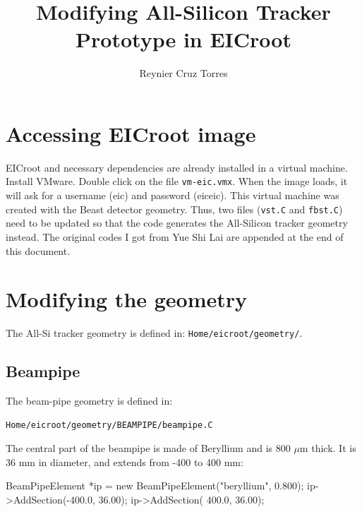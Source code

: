 \documentclass[12pt]{article}
\title{Modifying All-Silicon Tracker Prototype in EICroot}
\author{Reynier Cruz Torres}
\begin{document}
\maketitle

\tableofcontents

\newpage
\section{Accessing EICroot image}

EICroot and necessary dependencies are already installed in a virtual machine.
Install VMware.
Double click on the file \verb|vm-eic.vmx|.
When the image loads, it will ask for a username (eic) and password (eiceic).
This virtual machine was created with the Beast detector geometry. Thus, two files (\verb|vst.C| and \verb|fbst.C|) need to be updated
so that the code generates the All-Silicon tracker geometry instead. The original codes I got from Yue Shi Lai are appended at the end of this document.

\section{Modifying the geometry}

The All-Si tracker geometry is defined in: \verb|Home/eicroot/geometry/|.

\subsection{Beampipe}

The beam-pipe geometry is defined in:

\begin{tcolorbox}
\begin{verbatim}
Home/eicroot/geometry/BEAMPIPE/beampipe.C
\end{verbatim}  
\end{tcolorbox}

The central part of the beampipe is made of Beryllium and is 800 $\mu$m thick.
It is 36 mm in diameter, and extends from -400 to 400 mm:

\begin{tcolorbox}
\begin{verbnobox}[\scriptsize]
BeamPipeElement *ip = new BeamPipeElement("beryllium", 0.800);
ip->AddSection(-400.0, 36.00);
ip->AddSection( 400.0, 36.00);
\end{verbnobox}  
\end{tcolorbox}
\end{document}

